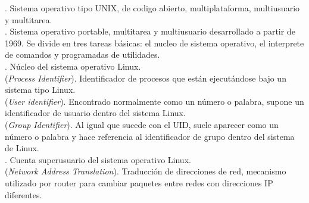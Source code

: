 \documentclass[12pt]{article}
\begin{document}
		 
		 
	
	. Sistema operativo tipo UNIX, de codigo abierto, multiplataforma, multiusuario y multitarea.\\
	
	. Sistema operativo portable, multitarea y multiusuario desarrollado a partir de 1969. Se divide en tres tareas básicas: el nucleo de sistema operativo, el interprete de comandos y programadas de utilidades.  \\
		 
	. Núcleo del sistema operativo Linux.\\
		 
	 (\textit{Process Identifier}). Identificador de procesos que están ejecutándose bajo un sistema tipo Linux.\\
	
	 (\textit{User identifier}). Encontrado normalmente como un número o palabra, supone un identificador de usuario dentro del sistema Linux.\\
	
	 (\textit{Group Identifier}). Al igual que sucede con el UID, suele aparecer como un número o palabra y hace referencia al identificador de grupo dentro del sistema de Linux.\\
		 
	. Cuenta superusuario del sistema operativo Linux.\\
		 
	
	 (\textit{Network Address Translation}). Traducción de direcciones de red, mecanismo utilizado por router para cambiar paquetes entre redes con direcciones IP diferentes.\\
		 
\end{document}
